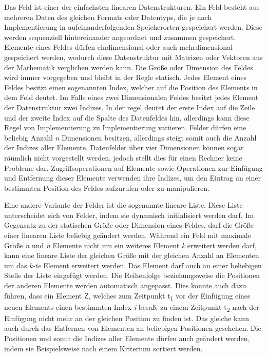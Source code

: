 Das Feld ist einer der einfachsten linearen Datenstrukturen. Ein Feld besteht aus mehreren Daten des gleichen Formats oder Datentyps, die je nach Implementierung in aufeinanderfolgenden Speicherorten gespeichert werden. Diese werden sequenziell hintereinander angeordnet und zusammen gespeichert. Elemente eines Feldes dürfen eindimensional oder auch mehrdimensional gespeichert werden, wodurch diese Datenstruktur mit Matrizen oder Vektoren aus der Mathematik verglichen werden kann. Die Größe oder Dimension des Feldes wird immer vorgegeben und bleibt in der Regle statisch. Jedes Element eines Feldes besitzt einen sogenannten Index, welcher auf die Position des Elements in dem Feld deutet. Im Falle eines zwei Dimensionalen Feldes besitzt jedes Element der Datenstruktur zwei Indizes. In der regel deutet der erste Index auf die Zeile und der zweite Index auf die Spalte des Datenfeldes hin, allerdings kann diese Regel von Implementierung zu Implementierung variieren. Felder dürfen eine beliebig Anzahl \textit{n} Dimensionen besitzen, allerdings steigt somit auch die Anzahl der Indizes aller Elemente. Datenfelder über vier Dimensionen können sogar räumlich nicht vorgestellt werden, jedoch stellt dies für einen Rechner keine Probleme dar. Zugriffsoperationen auf Elemente sowie Operationen zur Einfügung und Entfernung dieser Elemente verwenden ihre Indizes, um den Eintrag an einer bestimmten Position des Feldes aufzurufen oder zu manipulieren. \autocite[35-36]{ollmert_datenstrukturen_2020}

Eine andere Variante der Felder ist die sogenannte lineare Liste. Diese Liste unterscheidet sich von Felder, indem sie dynamisch initialisiert werden darf. Im Gegensatz zu der statischen Größe oder Dimension eines Feldes, darf die Größe einer linearen Liste beliebig geändert werden. Während ein Feld mit maximale Größe \textit{n} und \textit{n} Elemente nicht um ein weiteres Element \textit{k} erweitert werden darf, kann eine lineare Liste der gleichen Größe mit der gleichen Anzahl an Elementen um das \textit{k-te} Element erweitert werden. Das Element darf auch an einer beliebigen Stelle der Liste eingefügt werden. Die Reihenfolge beziehungsweise die Positionen der anderen Elemente werden automatisch angepasst. Dies könnte auch dazu führen, dass ein Element Z, welches zum Zeitpunkt t\textsubscript{1} vor der Einfügung eines neuen Elements einen bestimmten Index \textit{i} besaß, zu einem Zeitpunkt t\textsubscript{2} nach der Einfügung nicht mehr an der gleichen Position zu finden ist. Das gleiche kann auch durch das Entfernen von Elementen an beliebigen Positionen geschehen. Die Positionen und somit die Indizes aller Elemente dürfen auch geändert werden, indem sie Beispielsweise nach einem Kriterium sortiert werden. \autocite[40-42]{ollmert_datenstrukturen_2020}

